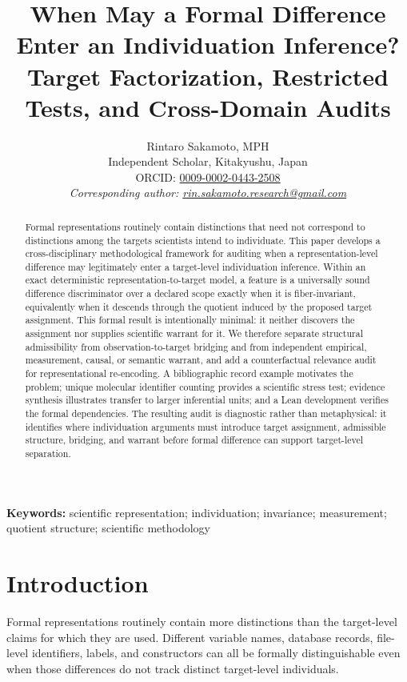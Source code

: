 \documentclass[11pt]{article}
\title{When May a Formal Difference Enter an Individuation Inference?\\
\large Target Factorization, Restricted Tests, and Cross-Domain Audits}
\author{Rintaro Sakamoto, MPH\\
Independent Scholar, Kitakyushu, Japan\\
ORCID: \href{https://orcid.org/0009-0002-0443-2508}{0009-0002-0443-2508}\\
\textit{Corresponding author: \href{mailto:rin.sakamoto.research@gmail.com}{rin.sakamoto.research@gmail.com}}}
\date{}
\begin{document}
\maketitle

\begin{abstract}

Formal representations routinely contain distinctions that need not correspond to distinctions among the targets scientists intend to individuate. This paper develops a cross-disciplinary methodological framework for auditing when a representation-level difference may legitimately enter a target-level individuation inference. Within an exact deterministic representation-to-target model, a feature is a universally sound difference discriminator over a declared scope exactly when it is fiber-invariant, equivalently when it descends through the quotient induced by the proposed target assignment. This formal result is intentionally minimal: it neither discovers the assignment nor supplies scientific warrant for it. We therefore separate structural admissibility from observation-to-target bridging and from independent empirical, measurement, causal, or semantic warrant, and add a counterfactual relevance audit for representational re-encoding. A bibliographic record example motivates the problem; unique molecular identifier counting provides a scientific stress test; evidence synthesis illustrates transfer to larger inferential units; and a Lean development verifies the formal dependencies. The resulting audit is diagnostic rather than metaphysical: it identifies where individuation arguments must introduce target assignment, admissible structure, bridging, and warrant before formal difference can support target-level separation.

\end{abstract}

\noindent\textbf{Keywords:} scientific representation; individuation; invariance; measurement; quotient structure; scientific methodology

\section{Introduction}

Formal representations routinely contain more distinctions than the target-level claims for which they are used. Different variable names, database records, file-level identifiers, labels, and constructors can all be formally distinguishable even when those differences do not track distinct target-level individuals.
\end{document}
